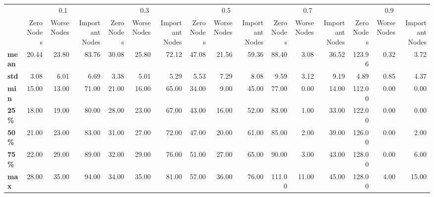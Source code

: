 \begin{tabular}{lrrrrrrrrrrrrrrr}
\toprule
{} & \multicolumn{3}{c}{0.1} & \multicolumn{3}{c}{0.3} & \multicolumn{3}{c}{0.5} & \multicolumn{3}{c}{0.7} & \multicolumn{3}{c}{0.9} \\
{} & Zero Nodes & Worse Nodes & Important Nodes & Zero Nodes & Worse Nodes & Important Nodes & Zero Nodes & Worse Nodes & Important Nodes & Zero Nodes & Worse Nodes & Important Nodes & Zero Nodes & Worse Nodes & Important Nodes \\
\midrule
\textbf{mean} &      20.44 &       23.80 &           83.76 &      30.08 &       25.80 &           72.12 &      47.08 &       21.56 &           59.36 &      88.40 &        3.08 &           36.52 &     123.96 &        0.32 &            3.72 \\
\textbf{std } &       3.08 &        6.01 &            6.69 &       3.38 &        5.01 &            5.29 &       5.53 &        7.29 &            8.08 &       9.59 &        3.12 &            9.19 &       4.89 &        0.85 &            4.37 \\
\textbf{min } &      15.00 &       13.00 &           71.00 &      21.00 &       16.00 &           65.00 &      34.00 &        9.00 &           45.00 &      77.00 &        0.00 &           14.00 &     112.00 &        0.00 &            0.00 \\
\textbf{25\% } &      18.00 &       19.00 &           80.00 &      28.00 &       23.00 &           67.00 &      43.00 &       16.00 &           52.00 &      83.00 &        1.00 &           33.00 &     122.00 &        0.00 &            0.00 \\
\textbf{50\% } &      21.00 &       23.00 &           83.00 &      31.00 &       27.00 &           72.00 &      47.00 &       20.00 &           61.00 &      85.00 &        2.00 &           39.00 &     126.00 &        0.00 &            2.00 \\
\textbf{75\% } &      22.00 &       29.00 &           89.00 &      32.00 &       29.00 &           76.00 &      51.00 &       27.00 &           65.00 &      90.00 &        3.00 &           43.00 &     128.00 &        0.00 &            6.00 \\
\textbf{max } &      28.00 &       35.00 &           94.00 &      34.00 &       35.00 &           81.00 &      57.00 &       36.00 &           76.00 &     111.00 &       11.00 &           45.00 &     128.00 &        4.00 &           15.00 \\
\bottomrule
\end{tabular}
